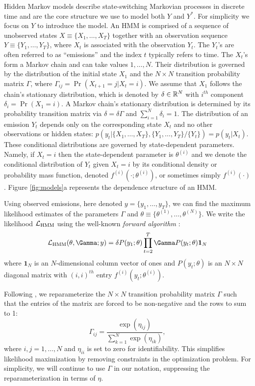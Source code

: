 Hidden Markov models describe state-switching Markovian processes in discrete time and are the core structure we use to model both $Y$ and $Y^*$. For simplicity we focus on $Y$ to introduce the model. An HMM is comprised of a sequence of unobserved states $X \equiv \big\{X_1, \ldots, X_T\big\}$ together with an observation sequence $Y \equiv \big\{Y_1, \ldots, Y_T\big\}$, where $X_t$ is associated with the observation $Y_t$. The $Y_t$'s are often referred to as ``emissions'' and the index $t$ typically refers to time. 
The $X_t$'s form a Markov chain and can take values $1, \ldots, N$. Their distribution is governed by the distribution of the initial state $X_1$ and the $N \times N$ transition probability matrix $\Gamma$, where $\Gamma_{ij} = \Pr(X_{t+1} = j | X_t = i)$. 
%
We assume that $X_1$ follows the chain's stationary distribution, which is denoted by $\delta \in \mathbb{R}^N$ with $i^{th}$ component
$\delta_i = \Pr(X_1 = i).$
A Markov chain's stationary distribution is determined by its probability transition matrix via $\delta = \delta \Gamma$ and $\sum_{i=1}^N \delta_i = 1$.
%
The distribution of an emission $Y_t$ depends only on the corresponding state $X_t$ and no other observations or hidden states: $p\left(y_t|\{X_1,\ldots, X_T\},\{Y_1,\ldots, Y_T\}/ \{Y_t\}\right) = p(y_t|X_t)$.
%
These conditional distributions are governed by state-dependent parameters. Namely, if $X_t = i$ then the state-dependent parameter is $\theta^{(i)}$ and we denote the conditional distribution of $Y_t$ given $X_t=i$ by its conditional density or probability mass function, denoted $f^{(i)}(\cdot ; \theta^{(i)})$, or sometimes simply $f^{(i)}(\cdot)$.
%
Figure \ref{fig:models}a represents the dependence structure of an HMM.

Using observed emissions, here denoted $y = \{y_1,\ldots,y_T\}$, we can find the maximum likelihood estimates of the parameters $\Gamma$ and $\theta \equiv \{\theta^{(1)},\ldots,\theta^{(N)}\}$. We write the likelihood $\mathcal{L}_{\text{HMM}}$ using the  well-known \textit{forward algorithm} \citep{Zucchini:2016}:
%
$$\calL_{\text{HMM}}(\theta,\Gamma;y) = \delta P(y_1;\theta) \prod_{t=2}^T \Gamma P(y_t;\theta) \mathbf{1}_N$$
%
where $\mathbf{1}_N$ is an $N$-dimensional column vector of ones and
%
$P(y_t;\theta)$ is an $N \times N$ diagonal matrix with $(i,i)^{th}$ entry  $f^{(i)}(y_t; \theta^{(i)})$.
%

Following \citet{Barajas:2017}, we reparameterize the $N \times N$ transition probability matrix $\Gamma$ such that the entries of the matrix are forced to be non-negative and the rows to sum to 1:
%
\[
\Gamma_{ij} = \frac{\exp(\eta_{ij})}{\sum_{k=1}^N \exp(\eta_{ik})}, 
\]
%
where $i,j = 1,\ldots,N$ and $\eta_{ii}$ is set to zero for identifiability. This simplifies likelihood maximization by removing constraints in the optimization problem. For simplicity, we will continue to use $\Gamma$ in our notation, suppressing the reparameterization in terms of $\eta$.

